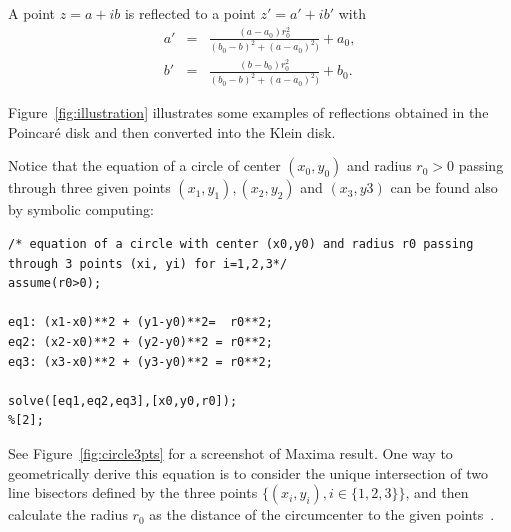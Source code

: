 \documentclass{article}
\begin{document}





A point $z=a+ib$ is reflected to a point $z'=a'+ib'$ with
\begin{eqnarray*}
a' &=& \frac{(a-a_0)r_0^2}{(b_0-b)^2+(a-a_0)^2)}+a_0,\\
b' &=& \frac{(b-b_0)r_0^2}{(b_0-b)^2+(a-a_0)^2)}+b_0.
\end{eqnarray*}

 Figure~\ref{fig:illustration} illustrates some examples of reflections obtained in the Poincar\'e disk and then converted into the Klein disk.


Notice that the equation of a circle  of center $(x_0,y_0)$ and radius $r_0>0$ passing through three given points $(x_1,y_1), (x_2,y_2)$ and $(x_3,y3)$ can be found also by symbolic computing:

\begin{lstlisting}
/* equation of a circle with center (x0,y0) and radius r0 passing through 3 points (xi, yi) for i=1,2,3*/
assume(r0>0);

eq1: (x1-x0)**2 + (y1-y0)**2=  r0**2;
eq2: (x2-x0)**2 + (y2-y0)**2 = r0**2;
eq3: (x3-x0)**2 + (y3-y0)**2 = r0**2;

solve([eq1,eq2,eq3],[x0,y0,r0]);
%[2];
\end{lstlisting} 

See Figure~\ref{fig:circle3pts} for a screenshot of {\sc Maxima} result.
One way to geometrically derive this equation is to consider the unique intersection of two line bisectors defined by the three points $\{(x_i,y_i), i\in\{1,2,3\}\}$, and then calculate the radius $r_0$ as the distance of the circumcenter to the given points~\cite{nielsen2005visual}.
\end{document}
